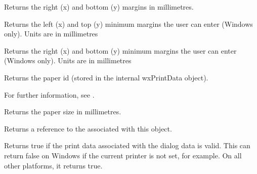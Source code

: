 
Returns the right (x) and bottom (y) margins in millimetres.

\label{wxpagesetupdialogdatagetminmargintopleft}


Returns the left (x) and top (y) minimum margins the user can enter (Windows only). Units
are in millimetres

\label{wxpagesetupdialogdatagetminmarginbottomright}


Returns the right (x) and bottom (y) minimum margins the user can enter (Windows only). Units
are in millimetres

\label{wxpagesetupdialogdatagetpaperid}


Returns the paper id (stored in the internal wxPrintData object).

For further information, see .

\label{wxpagesetupdialogdatagetpapersize}


Returns the paper size in millimetres.

\label{wxpagesetupdialogdatagetprintdata}


Returns a reference to the  associated with this object.

\label{wxpagesetupdialogdataisok}


Returns true if the print data associated with the dialog data is valid.
This can return false on Windows if the current printer is not set, for example.
On all other platforms, it returns true.

\label{wxpagesetupdialogdatasetdefaultinfo}

